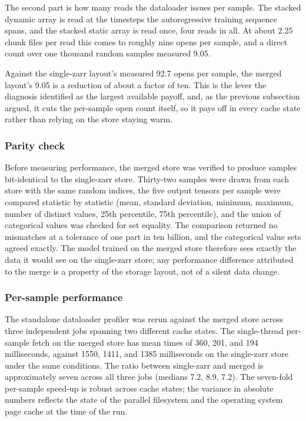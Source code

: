 \documentclass[12pt,a4paper]{article}
\begin{document}
The second part is how many reads the dataloader issues per sample. The stacked dynamic
array is read at the timesteps the autoregressive training sequence spans, and the stacked
static array is read once, four reads in all. At about 2.25 chunk files per read this comes
to roughly nine opens per sample, and a direct count over one thousand random samples
measured 9.05.

Against the single-zarr layout's measured 92.7 opens per sample, the merged layout's 9.05 is
a reduction of about a factor of ten. This is the lever the diagnosis identified as the
largest available payoff, and, as the previous subsection argued, it cuts the per-sample
open count itself, so it pays off in every cache state rather than relying on the store
staying warm.

\subsubsection{Parity check}

Before measuring performance, the merged store was verified to produce samples
bit-identical to the single-zarr store. Thirty-two samples were drawn from each store with
the same random indices, the five output tensors per sample were compared statistic by
statistic (mean, standard deviation, minimum, maximum, number of distinct values, 25th
percentile, 75th percentile), and the union of categorical values was checked for set
equality. The comparison returned no mismatches at a tolerance of one part in ten billion,
and the categorical value sets agreed exactly. The model trained on the merged store
therefore sees exactly the data it would see on the single-zarr store; any performance
difference attributed to the merge is a property of the storage layout, not of a silent
data change.

\subsubsection{Per-sample performance}

The standalone dataloader profiler was rerun against the merged store across three
independent jobs spanning two different cache states. The single-thread per-sample fetch
on the merged store has mean times of 360, 201, and 194 milliseconds, against 1550, 1411,
and 1385 milliseconds on the single-zarr store under the same conditions. The ratio between
single-zarr and merged is approximately seven across all three jobs (medians 7.2, 8.9,
7.2). The seven-fold per-sample speed-up is robust across cache states; the variance in
absolute numbers reflects the state of the parallel filesystem and the operating system
page cache at the time of the run.
\end{document}
